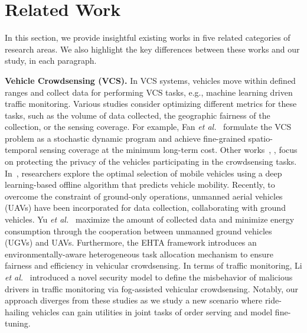 \section{Related Work}
In this section, we provide insightful existing works in five related categories of research areas. We also highlight the key differences between these works and our study, in each paragraph.


\smallskip
\noindent\textbf{Vehicle Crowdsensing (VCS).}
In VCS systems, vehicles move within defined ranges and collect data for performing VCS tasks, e.g., machine learning driven traffic monitoring. Various studies consider optimizing different metrics for these tasks, such as the volume of data collected, the geographic fairness of the collection, or the sensing coverage. For example, Fan \emph{et al.}~\cite{INFO21} formulate the VCS problem as a stochastic dynamic program and achieve fine-grained spatio-temporal sensing coverage at the minimum long-term cost. Other works~\cite{INFO23Privacy}, \cite{INFO22Privacy}, \cite{TITS2020Privacy} focus on protecting the privacy of the vehicles participating in the crowdsensing tasks. In~\cite{vehiclecrowdsensingdeepapproach}, researchers explore the optimal selection of mobile vehicles using a deep learning-based offline algorithm that predicts vehicle mobility. Recently, to overcome the constraint of ground-only operations, unmanned aerial vehicles (UAVs) have been incorporated for data collection, collaborating with ground vehicles. Yu \emph{et al.}~\cite{ICDE23} maximize the amount of collected data and minimize energy consumption through the cooperation between unmanned ground vehicles (UGVs) and UAVs. 
Furthermore, the EHTA framework\cite{lu2024ehta} introduces an environmentally-aware heterogeneous task allocation mechanism to ensure fairness and efficiency in vehicular crowdsensing.
In terms of traffic monitoring, Li \emph{et al.}~\cite{li2019privacy} introduced a novel security model to define the misbehavior of malicious drivers in traffic monitoring via fog-assisted vehicular crowdsensing.
Notably, our approach diverges from these studies as we study a new scenario where ride-hailing vehicles can gain utilities in joint tasks of order serving and model fine-tuning.

